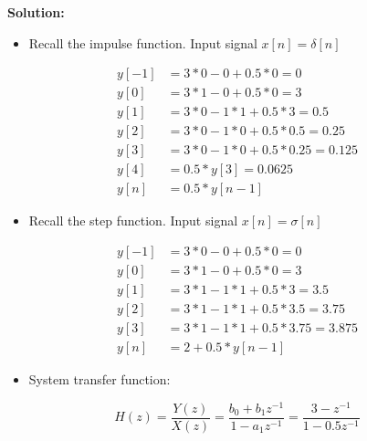 \textbf{Solution:}

\begin{itemize}
	\item Recall the impulse function. Input signal $x[n] = \delta[n]$
\end{itemize}

\begin{align*}
y[-1] &= 3*0 - 0 + 0.5*0 = 0 \\
	y[0] &= 3*1 - 0 + 0.5*0 = 3 \\
	y[1] &= 3*0 - 1*1 + 0.5*3 = 0.5 \\
	y[2] &= 3*0 - 1*0 + 0.5*0.5 = 0.25 \\
	y[3] &= 3*0 - 1*0 + 0.5*0.25 = 0.125 \\
	y[4] &= 0.5*y[3] = 0.0625 \\
	y[n] &= 0.5*y[n-1]
\end{align*}

\begin{itemize}
	\item Recall the step function. Input signal $x[n] = \sigma[n]$
\end{itemize}

\begin{align*}
y[-1] &= 3*0 - 0 + 0.5*0 = 0 \\
	y[0] &= 3*1 - 0 + 0.5*0 = 3 \\
	y[1] &= 3*1 - 1*1 + 0.5*3 = 3.5 \\
	y[2] &= 3*1 - 1*1 + 0.5*3.5 = 3.75 \\
	y[3] &= 3*1 - 1*1 + 0.5*3.75 =  3.875\\
	y[n] &= 2 + 0.5*y[n-1]
\end{align*}

\begin{itemize}
	\item System transfer function:
\end{itemize}


$$	H(z) = \frac{Y(z)}{X(z)} = \frac{b_0+b_1z^{-1}}{1-a_1z^{-1}} = \frac{3-z^{-1}}{1 - 0.5z^{-1}} $$